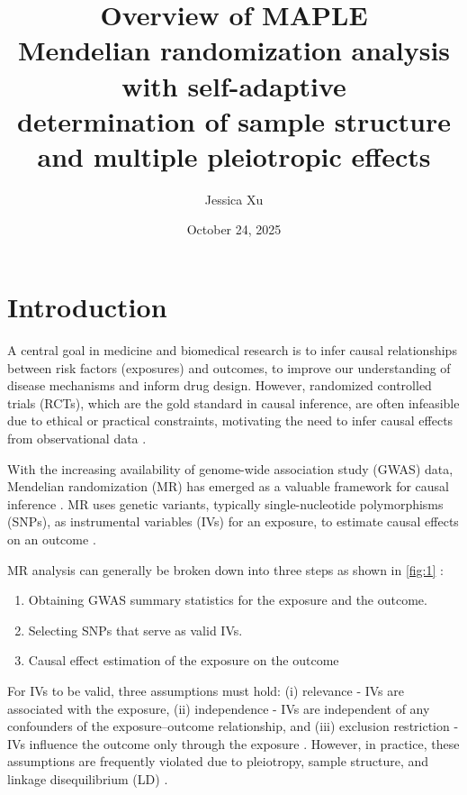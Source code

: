 \documentclass[12pt]{article}
\title{%
  Overview of MAPLE\\
  \large Mendelian randomization analysis with self-adaptive \\
  determination of sample structure and multiple pleiotropic effects}
\author{Jessica Xu}
\date{October 24, 2025} %
\begin{document}
\maketitle
\newpage
\section{Introduction}\label{sec:intro}

A central goal in medicine and biomedical research is to infer causal relationships between risk factors (exposures) and outcomes, to improve our understanding of disease mechanisms and inform drug design. However, randomized controlled trials (RCTs), which are the gold standard in causal inference, are often infeasible due to ethical or practical constraints, motivating the need to infer causal effects from observational data \citep{Deaton2018}.


With the increasing availability of genome-wide association study (GWAS) data, Mendelian randomization (MR) has emerged as a valuable framework for causal inference \citep{DaveySmith2003}. MR uses genetic variants, typically single-nucleotide polymorphisms (SNPs), as instrumental variables (IVs) for an exposure, to estimate causal effects on an outcome \citep{DaveySmith2003}.


MR analysis can generally be broken down into three steps as shown in \cref{fig:1} \citep{Zhang2025}:
\begin{enumerate}
    \item Obtaining GWAS summary statistics for the exposure and the outcome.
    \item Selecting SNPs that serve as valid IVs.
    \item Causal effect estimation of the exposure on the outcome
\end{enumerate}

For IVs to be valid, three assumptions must hold: (i) relevance - IVs are associated with the exposure, (ii) independence - IVs are independent of any confounders of the exposure–outcome relationship, and (iii) exclusion restriction - IVs influence the outcome only through the exposure \citep{Angrist1996}. However, in practice, these assumptions are frequently violated due to pleiotropy, sample structure, and linkage disequilibrium (LD) \citep{Zhang2025}.
\end{document}
